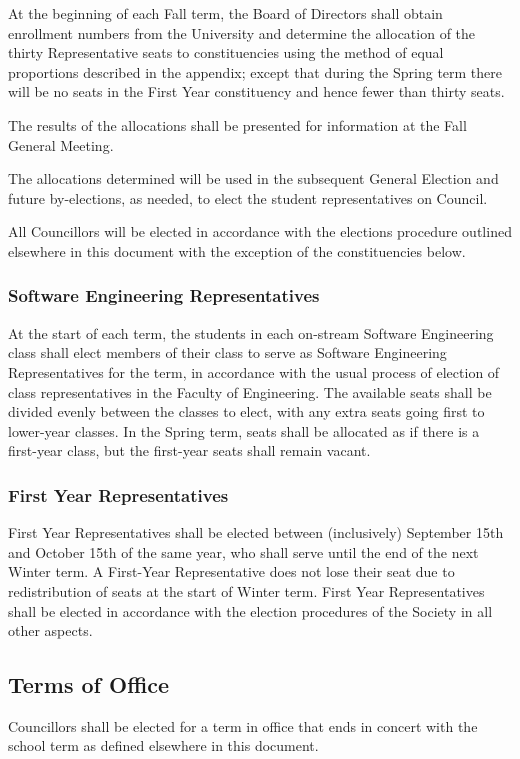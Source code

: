 At the beginning of each Fall term, the Board of Directors shall obtain 
enrollment numbers from the University and determine the allocation of the thirty
Representative seats to constituencies using the method of equal proportions
described in the appendix; except that during the Spring term there will be
no seats in the First Year constituency and hence fewer than thirty seats.

The results of the allocations shall be presented for information at the 
Fall General Meeting.

The allocations determined will be used in the subsequent General Election 
and future by-elections, as needed, to elect the student representatives on Council. 

All Councillors will be elected in accordance with the elections procedure outlined
elsewhere in this document with the exception of the constituencies below.

\subsubsection{Software Engineering Representatives}
At the start of each term, the students in each on-stream Software Engineering
class shall elect members of their class to serve as Software Engineering
Representatives for the term, in accordance with the usual process of election
of class representatives in the Faculty of Engineering. The available seats
shall be divided evenly between the classes to elect, with any extra seats going
first to lower-year classes. In the Spring term, seats shall be allocated as if
there is a first-year class, but the first-year seats shall remain vacant.

\subsubsection{First Year Representatives}
First Year Representatives shall be elected between (inclusively) September 15th 
and October 15th of the same year, who shall serve until the end of the next Winter 
term. A First-Year Representative does not lose their seat due to redistribution of 
seats at the start of Winter term. First Year Representatives shall be elected in 
accordance with the election procedures of the Society in all other aspects.

\subsection{Terms of Office}
Councillors shall be elected for a term in office that ends in concert with the
school term as defined elsewhere in this document.

